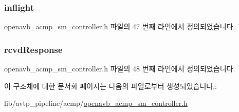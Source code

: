 \subsubsection[{\texorpdfstring{inflight}{inflight}}]{ inflight}\hypertarget{structopenavb__acmp__sm__controller__vars__t_a8757a9f120141662b8b4c8b44c502c3c}{}\label{structopenavb__acmp__sm__controller__vars__t_a8757a9f120141662b8b4c8b44c502c3c}


openavb\+\_\+acmp\+\_\+sm\+\_\+controller.\+h 파일의 47 번째 라인에서 정의되었습니다.

\subsubsection[{\texorpdfstring{rcvd\+Response}{rcvdResponse}}]{ rcvd\+Response}\hypertarget{structopenavb__acmp__sm__controller__vars__t_aed3656b45b6db94eb58f5cec2d2c7323}{}\label{structopenavb__acmp__sm__controller__vars__t_aed3656b45b6db94eb58f5cec2d2c7323}


openavb\+\_\+acmp\+\_\+sm\+\_\+controller.\+h 파일의 48 번째 라인에서 정의되었습니다.



이 구조체에 대한 문서화 페이지는 다음의 파일로부터 생성되었습니다.\+:\begin{DoxyCompactItemize}
\item 
lib/avtp\+\_\+pipeline/acmp/\hyperlink{openavb__acmp__sm__controller_8h}{openavb\+\_\+acmp\+\_\+sm\+\_\+controller.\+h}\end{DoxyCompactItemize}
